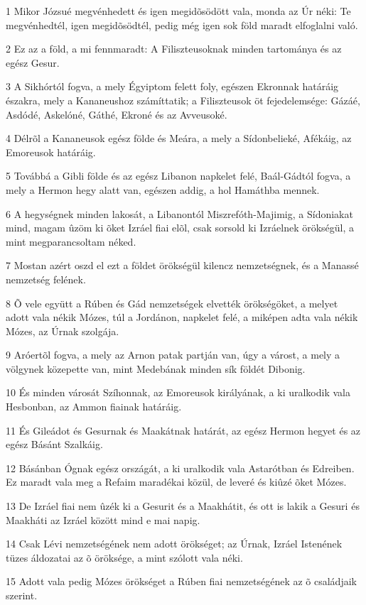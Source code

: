 \par 1 Mikor Józsué megvénhedett és igen megidõsödött vala, monda az Úr néki: Te megvénhedtél, igen megidõsödtél, pedig még igen sok föld maradt elfoglalni való.
\par 2 Ez az a föld, a mi fennmaradt: A Filiszteusoknak minden tartománya és az egész Gesur.
\par 3 A Sikhórtól fogva, a mely Égyiptom felett foly, egészen Ekronnak határáig északra, mely a Kananeushoz számíttatik; a Filiszteusok öt fejedelemsége: Gázáé, Asdódé, Askelóné, Gáthé, Ekroné és az Avveusoké.
\par 4 Délrõl a Kananeusok egész földe és Meára, a mely a Sídonbelieké, Afékáig, az Emoreusok határáig.
\par 5 Továbbá a Gibli földe és az egész Libanon napkelet felé, Baál-Gádtól fogva, a mely a Hermon hegy alatt van, egészen addig, a hol Hamáthba mennek.
\par 6 A hegységnek minden lakosát, a Libanontól Miszrefóth-Majimig, a Sídoniakat mind, magam ûzöm ki õket Izráel fiai elõl, csak sorsold ki Izráelnek örökségül, a mint megparancsoltam néked.
\par 7 Mostan azért oszd el ezt a földet örökségül kilencz nemzetségnek, és a Manassé nemzetség felének.
\par 8 Õ vele együtt a Rúben és Gád nemzetségek elvették örökségöket, a melyet adott vala nékik Mózes, túl a Jordánon, napkelet felé, a miképen adta vala nékik Mózes, az Úrnak szolgája.
\par 9 Aróertõl fogva, a mely az Arnon patak partján van, úgy a várost, a mely a völgynek közepette van, mint Medebának minden sík földét Dibonig.
\par 10 És minden városát Szíhonnak, az Emoreusok királyának, a ki uralkodik vala Hesbonban, az Ammon fiainak határáig.
\par 11 És Gileádot és Gesurnak és Maakátnak határát, az egész Hermon hegyet és az egész Básánt Szalkáig.
\par 12 Básánban Ógnak egész országát, a ki uralkodik vala Astarótban és Edreiben. Ez maradt vala meg a Refaim maradékai közül, de leveré és kiûzé õket Mózes.
\par 13 De Izráel fiai nem ûzék ki a Gesurit és a Maakhátit, és ott is lakik a Gesuri és Maakháti az Izráel között mind e mai napig.
\par 14 Csak Lévi nemzetségének nem adott örökséget; az Úrnak, Izráel Istenének tüzes áldozatai az õ öröksége, a mint szólott vala néki.
\par 15 Adott vala pedig Mózes örökséget a Rúben fiai nemzetségének az õ családjaik szerint.

